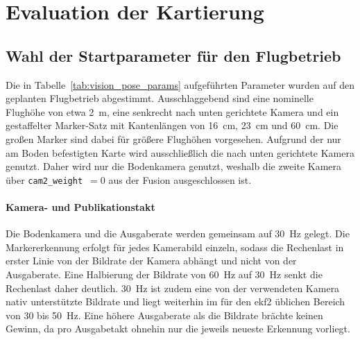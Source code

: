 \section{Evaluation der Kartierung}



\subsection{Wahl der Startparameter für den Flugbetrieb}
\label{subsec:pos_parametrierung}

Die in Tabelle~\ref{tab:vision_pose_params} aufgeführten Parameter wurden auf den geplanten Flugbetrieb abgestimmt.
Ausschlaggebend sind eine nominelle Flughöhe von etwa 2~m, eine senkrecht nach unten gerichtete Kamera und ein gestaffelter Marker-Satz mit Kantenlängen von 16~cm, 23~cm und 60~cm.
Die großen Marker sind dabei für größere Flughöhen vorgesehen.
Aufgrund der nur am Boden befestigten Karte wird ausschließlich die nach unten gerichtete Kamera genutzt.
Daher wird nur die Bodenkamera genutzt, weshalb die zweite Kamera über \texttt{cam2\_weight}~$=0$ aus der Fusion ausgeschlossen ist.


\paragraph{Kamera- und Publikationstakt}
Die Bodenkamera und die Ausgaberate werden gemeinsam auf 30~Hz gelegt.
Die Markererkennung erfolgt für jedes Kamerabild einzeln, sodass die Rechenlast in erster Linie von der Bildrate der Kamera abhängt und nicht von der Ausgaberate.
Eine Halbierung der Bildrate von 60~Hz auf 30~Hz senkt die Rechenlast daher deutlich.
30~Hz ist zudem eine von der verwendeten Kamera nativ unterstützte Bildrate und liegt weiterhin im für den \gls{ekf2} üblichen Bereich von 30 bis 50~Hz.
Eine höhere Ausgaberate als die Bildrate brächte keinen Gewinn, da pro Ausgabetakt ohnehin nur die jeweils neueste Erkennung vorliegt.

